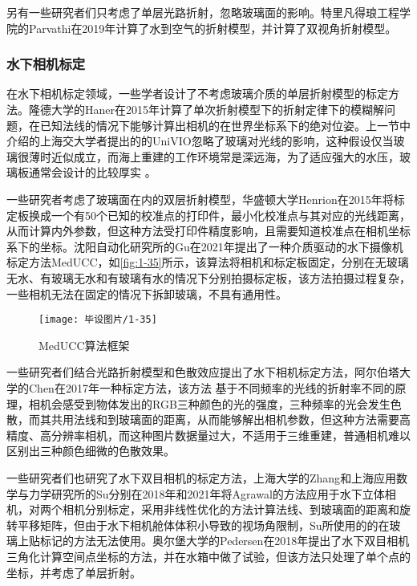 另有一些研究者们只考虑了单层光路折射，忽略玻璃面的影响。特里凡得琅工程学院的Parvathi\cite{Parvathi}在2019年计算了水到空气的折射模型，并计算了双视角折射模型。

\subsubsection{水下相机标定}

在水下相机标定领域，一些学者设计了不考虑玻璃介质的单层折射模型的标定方法。隆德大学的Haner\cite{Haner}在2015年计算了单次折射模型下的折射定律下的模糊解问题，在已知法线的情况下能够计算出相机的在世界坐标系下的绝对位姿。上一节中介绍的上海交大学者提出的的UniVIO\cite{MIAO}忽略了玻璃对光线的影响，这种假设仅当玻璃很薄时近似成立，而海上重建的工作环境常是深远海，为了适应强大的水压，玻璃板通常会设计的比较厚实 。

一些研究者考虑了玻璃面在内的双层折射模型，华盛顿大学Henrion\cite{Henrion}在2015年将标定板换成一个有50个已知的校准点的打印件，最小化校准点与其对应的光线距离，从而计算内外参数，但这种方法受打印件精度影响，且需要知道校准点在相机坐标系下的坐标。沈阳自动化研究所的Gu\cite{MedUCC}在2021年提出了一种介质驱动的水下摄像机标定方法MedUCC，如\autoref{fig:1-35}所示，该算法将相机和标定板固定，分别在无玻璃无水、有玻璃无水和有玻璃有水的情况下分别拍摄标定板，该方法拍摄过程复杂，一些相机无法在固定的情况下拆卸玻璃，不具有通用性。

\begin{figure}[htbp]
    \centering
    \texttt{[image: 毕设图片/1-35]}
    \caption{\label{fig:1-35}MedUCC算法框架}
\end{figure}

一些研究者们结合光路折射模型和色散效应提出了水下相机标定方法，阿尔伯塔大学的Chen\cite{closed}在2017年一种标定方法，该方法 基于不同频率的光线的折射率不同的原理，相机会感受到物体发出的RGB三种颜色的光的强度，三种频率的光会发生色散，而其共用法线和到玻璃面的距离，从而能够解出相机参数，但这种方法需要高精度、高分辨率相机，而这种图片数据量过大，不适用于三维重建，普通相机难以区别出三种颜色细微的色散效果。

一些研究者们也研究了水下双目相机的标定方法，上海大学的Zhang\cite{Zhang}和上海应用数学与力学研究所的Su\cite{Optics}分别在2018年和2021年将Agrawal的方法应用于水下立体相机，对两个相机分别标定，采用非线性优化的方法计算法线、到玻璃面的距离和旋转平移矩阵，但由于水下相机舱体体积小导致的视场角限制，Su所使用的的在玻璃上贴标记的方法无法使用。奥尔堡大学的Pedersen\cite{Pedersen}在2018年提出了水下双目相机三角化计算空间点坐标的方法，并在水箱中做了试验，但该方法只处理了单个点的坐标，并考虑了单层折射。


